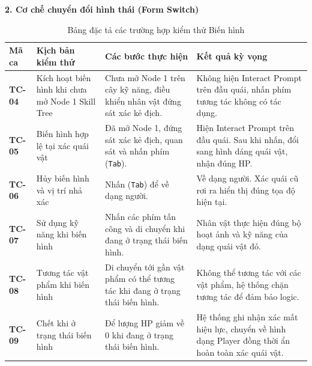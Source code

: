 \documentclass[../DoAn.tex]{subfiles}
\begin{document}
\vspace{10pt}
\textbf{2. Cơ chế chuyển đổi hình thái (Form Switch)}
\begin{table}[H]
\centering
\begin{tabular}{|p{1.2cm}|p{3.8cm}|p{3.8cm}|p{4.3cm}|}
\hline
\textbf{Mã ca} & \textbf{Kịch bản kiểm thử} & \textbf{Các bước thực hiện} & \textbf{Kết quả kỳ vọng} \\ \hline
\textbf{TC-04} & Kích hoạt biến hình khi chưa mở Node 1 Skill Tree & Chưa mở Node 1 trên cây kỹ năng, điều khiển nhân vật đứng sát xác kẻ địch. & Không hiện Interact Prompt trên đầu quái, nhấn phím tương tác không có tác dụng. \\ \hline
\textbf{TC-05} & Biến hình hợp lệ tại xác quái vật & Đã mở Node 1, đứng sát xác kẻ địch, quan sát và nhấn phím (\texttt{Tab}). & Hiện Interact Prompt trên đầu quái. Sau khi nhấn, đổi sang hình dáng quái vật, nhận đúng HP. \\ \hline
\textbf{TC-06} & Hủy biến hình và vị trí nhả xác & Nhấn (\texttt{Tab}) để về dạng người. & Về dạng người. Xác quái cũ rơi ra hiển thị đúng tọa độ hiện tại. \\ \hline
\textbf{TC-07} & Sử dụng kỹ năng khi biến hình & Nhấn các phím tấn công và di chuyển khi đang ở trạng thái biến hình. & Nhân vật thực hiện đúng bộ hoạt ảnh và kỹ năng của dạng quái vật đó. \\ \hline
\textbf{TC-08} & Tương tác vật phẩm khi biến hình & Di chuyển tới gần vật phẩm có thể tương tác khi đang ở trạng thái biến hình. & Không thể tương tác với các vật phẩm, hệ thống chặn tương tác để đảm bảo logic. \\ \hline
\textbf{TC-09} & Chết khi ở trạng thái biến hình & Để lượng HP giảm về 0 khi đang ở trạng thái biến hình. & Hệ thống ghi nhận xác mất hiệu lực, chuyển về hình dạng Player đồng thời ẩn hoàn toàn xác quái vật. \\ \hline
\end{tabular}
\caption{Bảng đặc tả các trường hợp kiểm thử Biến hình}
\label{table:test_formswitch}
\end{table}
\end{document}
